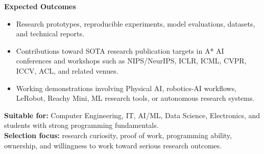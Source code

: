 \documentclass[10pt,a4paper]{article}
\newcommand{\RoleSection}[1]{\vspace{5pt}\par\noindent\textbf{#1}\par\vspace{2pt}}
\begin{document}
{\RoleSection{Expected Outcomes}
\begin{itemize}
  \item Research prototypes, reproducible experiments, model evaluations, datasets, and technical reports.
  \item Contributions toward SOTA research publication targets in A* AI conferences and workshops such as NIPS/NeurIPS, ICLR, ICML, CVPR, ICCV, ACL, and related venues.
  \item Working demonstrations involving Physical AI, robotics-AI workflows, LeRobot, Reachy Mini, ML research tools, or autonomous research systems.
\end{itemize}

\textbf{Suitable for:} Computer Engineering, IT, AI/ML, Data Science, Electronics, and students with strong programming fundamentals.\\
\textbf{Selection focus:} research curiosity, proof of work, programming ability, ownership, and willingness to work toward serious research outcomes.
}
\end{document}
